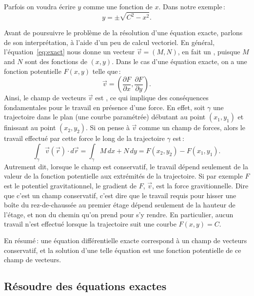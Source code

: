 Parfois on voudra écrire $y$ comme une fonction de $x$.  Dans notre exemple\,: 
\begin{equation*}
y = \pm \sqrt{C^2-x^2} .
\end{equation*}

Avant de poursuivre le problème de la résolution d'une équation exacte, parlons de son interprétation, à l'aide d'un peu de calcul vectoriel.  En général, l'équation~\eqref{eq:exact} nous donne un vecteur $\vec{v} = (M,N)$, en fait un \emph{},
puisque $M$ and $N$ sont des fonctions de $(x,y)$.   Dans le cas d'une équation exacte, on a une fonction potentielle $F(x,y)$ telle que\,: 
\begin{equation*}
\vec{v} = \left( \frac{\partial F}{\partial x} ,\frac{\partial F}{\partial
y} \right) .
\end{equation*}
Ainsi, le champ de vecteurs $\vec{v}$ est \emph{}, ce qui implique des conséquences fondamentales pour le travail en présence d'une force.  En effet, soit 
$\gamma$ une trajectoire dans le plan (une courbe paramétrée) débutant au point $(x_1,y_1)$ et finissant au point
$(x_2,y_2)$.
Si on pense à $\vec{v}$ comme un champ de forces, alors le travail effectué par cette force le long de la trajectoire $\gamma$ est\,: 
\begin{equation*}
\int_\gamma \vec{v}(\vec{r}) \cdot d\vec{r}
=
\int_\gamma M \, dx + N \, dy
=
F(x_2,y_2) - F(x_1,y_1) .
\end{equation*}
Autrement dit, lorsque le champ est conservatif, le travail dépend seulement de la valeur de la fonction potentielle aux extrémités de la trajectoire.  Si par exemple $F$ est le potentiel gravitationnel, le gradient de $F$, $\vec{v}$, est la force gravitionnelle.
Dire que c'est un champ conservatif, c'est dire que le travail requis pour hisser une boîte du rez-de-chaussée au premier étage dépend seulement de la hauteur de l'étage, et non du chemin qu'on prend pour s'y rendre.
En particulier, aucun travail n'est effectué lorsque la trajectoire suit une courbe $F(x,y) = C$.

En résumé\,: une équation différentielle exacte correspond à un champ de vecteurs conservatif, et la solution d'une telle équation est une fonction potentielle de ce champ de vecteurs.

\subsection{Résoudre des équations exactes}

